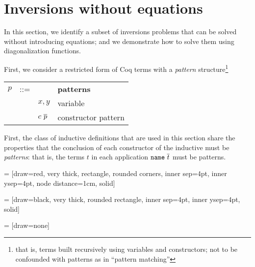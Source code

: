 \documentclass{llncs}
\begin{document}
\section{Inversions without equations}\label{sec:inversion-pattern}
In this section, we identify a subset of inversions problems that can
be solved without introducing equations; and we demonstrate how to
solve them using diagonalization functions.

First, we consider a restricted form of Coq terms with a
\emph{pattern} structure\footnote{that is, terms built recursively using
variables and constructors; not to be confounded with patterns as in ``pattern matching''}
\begin{center}
  \begin{tabular}{ccl@{\quad}l}
    $p$ & ::=& &  {\bf patterns} \\
    & & $x,y$ & variable \\
    & & $c~\overline{p}$ & constructor pattern
  \end{tabular}
\end{center}
%
First, the class of inductive definitions that are used in this
section share the properties that the conclusion of each constructor
of the inductive must be \emph{patterns}: that is, the terms $t$ in
each application ${\tt name}~\overline{t}$ must be patterns.

\newcommand\subst[3]{#1 \left[ #2 \leftarrow #3 \right]}
\newcommand{\mkterm}[5][]{
  \node[term,#1](#2){\begin{tabular}{c}#3\\#4\\#5\end{tabular}};}   
\newcommand{\mkclause}[4][]{
  \node[clause,#1](#2){\begin{tabular}{c@{,}c}#3 & #4 \end{tabular}};}   

 = [draw=red, very thick, rectangle, rounded corners, inner sep=4pt, inner ysep=4pt, node distance=1cm, solid]

 = [draw=black, very thick, rounded rectangle, inner sep=4pt, inner ysep=4pt, solid]

 = [draw=none]
\end{document}
